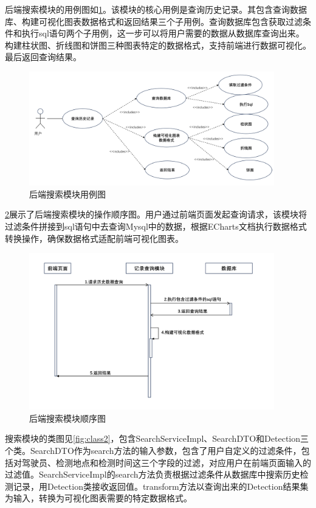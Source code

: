 后端搜索模块的用例图如\ref{fig:uml4}。该模块的核心用例是查询历史记录。其包含查询数据库、构建可视化图表数据格式和返回结果三个子用例。查询数据库包含获取过滤条件和执行sql语句两个子用例，这一步可以将用户需要的数据从数据库查询出来。构建柱状图、折线图和饼图三种图表特定的数据格式，支持前端进行数据可视化。最后返回查询结果。

\begin{figure}[!htb]
    \centering
    \includegraphics[width=0.95\textwidth]{figs/chap05/uml4.png}
    \caption{后端搜索模块用例图}
    \label{fig:uml4}
\end{figure}

\ref{fig:seq4}展示了后端搜索模块的操作顺序图。用户通过前端页面发起查询请求，该模块将过滤条件拼接到sql语句中去查询Mysql中的数据，根据ECharts文档执行数据格式转换操作，确保数据格式适配前端可视化图表。

\begin{figure}[h]
    \centering
    \includegraphics[width=0.95\textwidth]{figs/chap05/seq4.png}
    \caption{后端搜索模块顺序图}
    \label{fig:seq4}
\end{figure}

搜索模块的类图见\ref{fig:class2}，包含SearchServiceImpl、SearchDTO和Detection三个类。SearchDTO作为search方法的输入参数，包含了用户自定义的过滤条件，包括对驾驶员、检测地点和检测时间这三个字段的过滤，对应用户在前端页面输入的过滤值。SearchServiceImpl的search方法负责根据过滤条件从数据库中搜索历史检测记录，用Detection类接收返回值。transform方法以查询出来的Detection结果集为输入，转换为可视化图表需要的特定数据格式。


